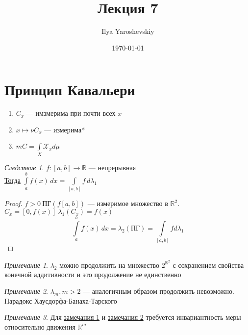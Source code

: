 \documentclass[english]{article}
\author{Ilya Yaroshevskiy}
\date{\today}
\title{Лекция 7}
\newcommand{\R}{\mathbb{R}}
\theoremstyle{plain}
\theoremstyle{remark}
\newtheorem*{remark}{Примечание}
\newtheorem{corollary}{Следствие}[theorem]
\theoremstyle{definition}
\begin{document}
\maketitle
\tableofcontents

\newcommand{\X}{\chi}
\newcommand{\A}{\mathfrak{A}}
\newcommand{\B}{\mathfrak{B}}
\newcommand{\M}{\mathfrak{M}}

\section{Принцип Кавальери}
\label{sec:orgc4b2462}
\begin{enumerate}
\item \(C_x\) --- имзмерима при почти всех \(x\)
\item \(x \mapsto \nu C_x\) --- измерима*
\item \(mC = \int\limits_X \mathcal{X}_x d\mu\)
\end{enumerate}
\begin{corollary}
\(f: [a, b] \to \R\) --- непрерывная \\
\uline{Тогда} \(\int\limits_a^b f(x)\,dx = \int\limits_{[a, b]} f\,d\lambda_1\)
\end{corollary}
\begin{proof}
\(f>0\ \text{ПГ}(f[a, b])\) --- измеримое множество в \(\R^2\). \(C_x = [0, f(x)]\ \lambda_1(C_x) = f(x)\)
\[ \int\limits_a^b f(x)\, dx = \lambda_2(\text{ПГ}) = \int\limits_{[a, b]} f d\lambda_1 \]
\end{proof}
\begin{remark}
\(\lambda_2\) можно продолжить на множество \(2^{\R^2}\) с сохранением свойства конечной аддитивности и это продолжение не единственно
\label{orgee4b765}
\end{remark}
\begin{remark}
\(\lambda_m, m>2\) --- аналогичным образом продолжить невозможно. Парадокс Хаусдорфа-Банаха-Тарского
\label{orga188732}
\end{remark}
\begin{remark}
Для \hyperref[orgee4b765]{замечания 1} и \hyperref[orga188732]{замечания 2} требуется инвариантность меры относительно движения \(\R^m\)
\end{remark}
\end{document}
